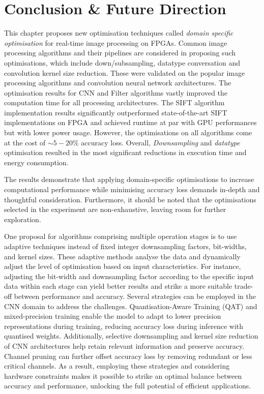 


\section{Conclusion \& Future Direction}
This chapter proposes new optimisation techniques called \textit{domain specific optimisation} for real-time image processing on FPGAs. Common image processing algorithms and their pipelines are considered in proposing such optimisations, which include down/subsampling, datatype conversation and convolution kernel size reduction. These were validated on the popular image processing algorithms and convolution neural network architectures. The optimisation results for CNN and Filter algorithms vastly improved the computation time for all processing architectures. The SIFT algorithm implementation results significantly outperformed state-of-the-art SIFT implementations on FPGA and achieved runtime at par with GPU performances but with lower power usage. However, the optimisations on all algorithms come at the cost of  $\sim5-20\%$ accuracy loss. Overall, \textit{Downsampling} and \textit{datatype} optimisation resulted in the most significant reductions in execution time and energy consumption. 

The results demonstrate that applying domain-specific optimisations to increase computational performance while minimising accuracy loss demands in-depth and thoughtful consideration. Furthermore, it should be noted that the optimisations selected in the experiment are non-exhaustive, leaving room for further exploration. 

One proposal for algorithms comprising multiple operation stages is to use adaptive techniques instead of fixed integer downsampling factors, bit-widths, and kernel sizes. These adaptive methods analyse the data and dynamically adjust the level of optimisation based on input characteristics. For instance, adjusting the bit-width and downsampling factor according to the specific input data within each stage can yield better results and strike a more suitable trade-off between performance and accuracy. Several strategies can be employed in the CNN domain to address the challenges. Quantisation-Aware Training (QAT) and mixed-precision training enable the model to adapt to lower precision representations during training, reducing accuracy loss during inference with quantised weights. Additionally, selective downsampling and kernel size reduction of CNN architectures help retain relevant information and preserve accuracy. Channel pruning can further offset accuracy loss by removing redundant or less critical channels. As a result, employing these strategies and considering hardware constraints makes it possible to strike an optimal balance between accuracy and performance, unlocking the full potential of efficient applications.

